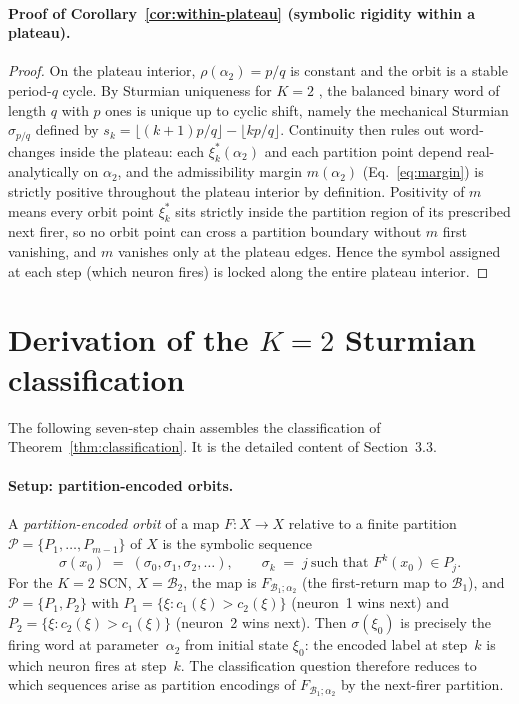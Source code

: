 \documentclass[12pt]{article}
\newcommand{\Bsp}{\mathcal{B}}
\begin{document}
\paragraph{Proof of Corollary~\ref{cor:within-plateau} (symbolic rigidity within a plateau).}
\begin{proof}
On the plateau interior, $\rho(\alpha_2)=p/q$ is constant and the orbit is a stable period-$q$ cycle. By Sturmian uniqueness for $K=2$ \citep{coven1973sequences,lothaire2002algebraic}, the balanced binary word of length $q$ with $p$ ones is unique up to cyclic shift, namely the mechanical Sturmian $\sigma_{p/q}$ defined by $s_k=\lfloor(k{+}1)p/q\rfloor-\lfloor kp/q\rfloor$. Continuity then rules out word-changes inside the plateau: each $\xi_k^*(\alpha_2)$ and each partition point depend real-analytically on $\alpha_2$, and the admissibility margin $m(\alpha_2)$ (Eq.~\eqref{eq:margin}) is strictly positive throughout the plateau interior by definition. Positivity of $m$ means every orbit point $\xi_k^*$ sits strictly inside the partition region of its prescribed next firer, so no orbit point can cross a partition boundary without $m$ first vanishing, and $m$ vanishes only at the plateau edges. Hence the symbol assigned at each step (which neuron fires) is locked along the entire plateau interior.
\end{proof}

\section{Derivation of the $K{=}2$ Sturmian classification}\label{app:sturmian-chain}

The following seven-step chain assembles the classification of Theorem~\ref{thm:classification}. It is the detailed content of Section~3.3.

\paragraph{Setup: partition-encoded orbits.}
A \emph{partition-encoded orbit} of a map $F:X\to X$ relative to a finite partition $\mathcal{P}=\{P_1,\ldots,P_{m-1}\}$ of $X$ is the symbolic sequence
\[
    \sigma(x_0) \;=\; (\sigma_0,\sigma_1,\sigma_2,\ldots), \qquad \sigma_k \;=\; j\ \text{such that }F^k(x_0)\in P_j.
\]
For the $K{=}2$ SCN, $X=\Bsp_2$, the map is $F_{\!\Bsp_1;\alpha_2}$ (the first-return map to $\Bsp_1$), and $\mathcal{P}=\{P_1,P_2\}$ with $P_1=\{\xi:c_1(\xi)>c_2(\xi)\}$ (neuron~1 wins next) and $P_2=\{\xi:c_2(\xi)>c_1(\xi)\}$ (neuron~2 wins next). Then $\sigma(\xi_0)$ is precisely the firing word at parameter~$\alpha_2$ from initial state $\xi_0$: the encoded label at step~$k$ is which neuron fires at step~$k$. The classification question therefore reduces to which sequences arise as partition encodings of $F_{\!\Bsp_1;\alpha_2}$ by the next-firer partition.
\end{document}
